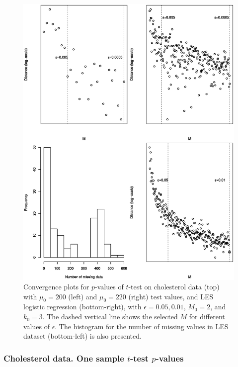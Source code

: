 \documentclass[11pt,a5paper,twoside]{book}
\begin{document}
{{\begin{figure}
	\centering
	\includegraphics[width=\textwidth]{fig_real_conv_gray.eps}
	\caption[Convergence plots for $p$-values of $t$-test on cholesterol data with $\mu_0=200$ and $\mu_0=220$ test values, and LES logistic regression, with $\epsilon=0.05, 0.01$, $M_0=2$, and $k_0=3$]{Convergence plots for $p$-values of $t$-test on cholesterol data (top) with $\mu_0=200$ (left) and $\mu_0=220$ (right) test values, and LES logistic regression (bottom-right), with $\epsilon=0.05, 0.01$, $M_0=2$, and $k_0=3$. The dashed vertical line shows the selected $M$ for different values of $\epsilon$. The histogram for the number of missing values in LES dataset (bottom-left) is also presented.}
	\label{fig_conv_real}
\end{figure} 

\subsubsection{Cholesterol data. One sample $t$-test $p$-values}

}}
\end{document}
